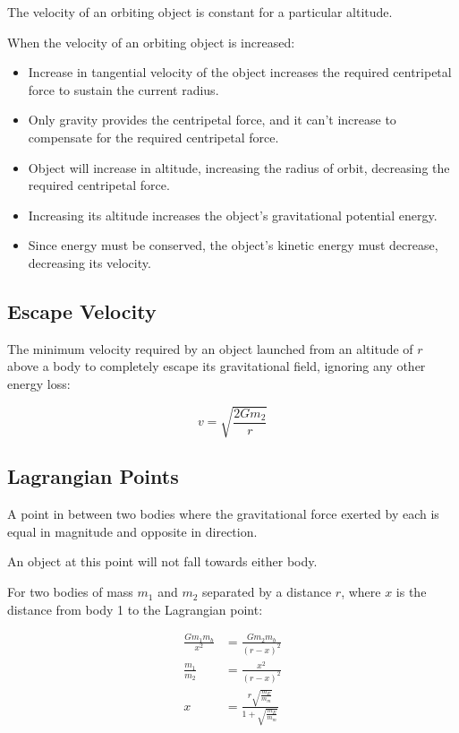 \documentclass[a4paper,11pt]{report}
\begin{document}
The velocity of an orbiting object is constant for a particular altitude.

When the velocity of an orbiting object is increased:

\begin{itemize}
\item Increase in tangential velocity of the object increases the required
	centripetal force to sustain the current radius.
\item Only gravity provides the centripetal force, and it can't increase to
	compensate for the required centripetal force.
\item Object will increase in altitude, increasing the radius of orbit,
	decreasing the required centripetal force.
\item Increasing its altitude increases the object's gravitational potential
	energy.
\item Since energy must be conserved, the object's kinetic energy must
	decrease, decreasing its velocity.
\end{itemize}

\subsection{Escape Velocity}

The minimum velocity required by an object launched from an altitude of $r$
above a body to completely escape its gravitational field, ignoring any other
energy loss:

$$
v = \sqrt{\frac{2 G m_2}{r}}
$$

\subsection{Lagrangian Points}

A point in between two bodies where the gravitational force exerted by each is
equal in magnitude and opposite in direction.

An object at this point will not fall towards either body.

For two bodies of mass $m_1$ and $m_2$ separated by a distance $r$, where $x$
is the distance from body 1 to the Lagrangian point:

$$
\begin{aligned}
\frac{G m_1 m_b}{x^2} & = \frac{G m_2 m_b}{(r - x)^2} \\
\frac{m_1}{m_2} & = \frac{x^2}{(r - x)^2} \\
x & = \frac{r\sqrt{\frac{m_E}{m_m}}}{1 + \sqrt{\frac{m_E}{m_m}}} \\
\end{aligned}
$$
\end{document}
